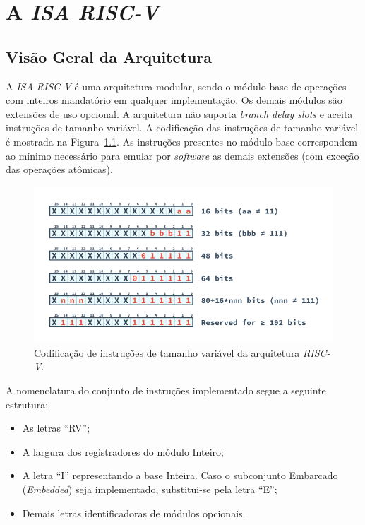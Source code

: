 \chapter{A \textit{ISA RISC-V}}\label{CapISA}


    \section{Visão Geral da Arquitetura}

        {A \textit{ISA RISC-V} é uma arquitetura modular, sendo o módulo base de operações com inteiros mandatório em qualquer implementação. Os demais módulos são extensões de uso opcional. A arquitetura não suporta \textit{branch delay slots} e aceita instruções de tamanho variável. A codificação das instruções de tamanho variável é mostrada na Figura~\ref{fig:riscv_var_length}. As instruções presentes no módulo base correspondem ao mínimo necessário para emular por \textit{software} as demais extensões (com exceção das operações atômicas).}

        \begin{figure}[H]
        \centering
            \includegraphics[width=1\linewidth]{images/RV_InstructionLength.png}
            \caption{Codificação de instruções de tamanho variável da arquitetura \textit{RISC-V}.}\label{fig:riscv_var_length}
        \end{figure}

        \clearpage

        {A nomenclatura do conjunto de instruções implementado segue a seguinte estrutura:}

        \begin{itemize}[leftmargin=20mm]
            \item {As letras ``RV'';}
            \item {A largura dos registradores do módulo Inteiro;}
            \item {A letra ``I'' representando a base Inteira. Caso o subconjunto Embarcado (\textit{Embedded}) seja implementado, substitui-se pela letra ``E'';}
            \item {Demais letras identificadoras de módulos opcionais.}
        \end{itemize}

